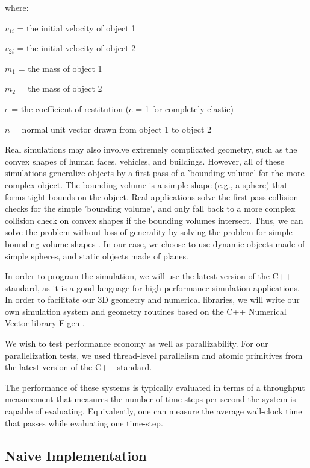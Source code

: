 \documentclass[CEJCS,PDF]{cej} %
\begin{document}
where:

$v_{1i}$ = the initial velocity of object 1

$v_{2i}$ = the initial velocity of object 2

$m_1$ = the mass of object 1

$m_2$ = the mass of object 2

$e$ = the coefficient of restitution ($e$ = 1 for completely elastic)

$n$ = normal unit vector drawn from object 1 to object 2


Real simulations may also involve extremely complicated geometry, such as the convex shapes of human faces, vehicles, and buildings.  However, 
all of these simulations generalize objects by a first pass of a 'bounding volume' for the more complex object.  The bounding volume is a simple shape (e.g., a sphere)
that forms tight bounds on the object.  Real applications solve the first-pass collision checks for the simple 'bounding volume', and only fall back to a more complex
collision check on convex shapes if the bounding volumes intersect.  Thus, we can solve the problem without loss of generality by solving the problem
for simple bounding-volume shapes \cite{uberflow,cloth}.  In our case, we choose to use dynamic objects made of simple spheres, and static objects made of planes.

In order to program the simulation, we will use the latest version of the C++ standard, as it is a good language for high performance simulation applications.  In order to facilitate our 
3D geometry and numerical libraries, we will write our own simulation system and geometry routines based on the C++ Numerical Vector library Eigen \cite{eigenweb}.  

We wish to test performance economy as well as parallizability.  For our parallelization tests, we used thread-level parallelism and atomic primitives from the latest version of the C++ standard.

The performance of these systems is typically evaluated in terms of a throughput measurement that measures the number of time-steps per second the system is capable of evaluating.  Equivalently, one can measure the average wall-clock time that passes while evaluating one time-step.

\subsection{Naive Implementation}
\end{document}
